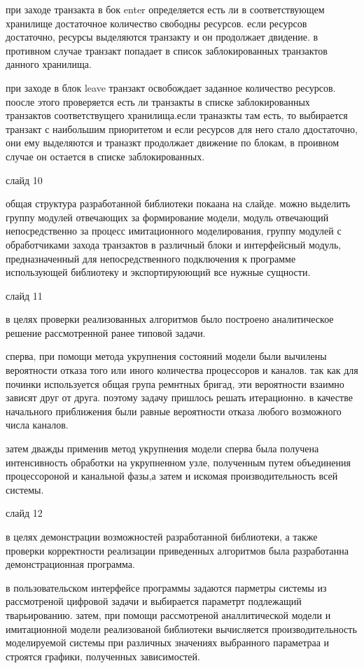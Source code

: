 \documentclass[utf8x, 12pt]{G7-32} %
\begin{document}
при заходе транзакта в бок enter определяется есть ли в соответствующем хранилище достаточное количество свободны ресурсов. если ресурсов достаточно, ресурсы выделяются транзакту и он продолжает двидение. в противном случае транзакт попадает в список заблокированных транзактов данного хранилища.

при заходе в блок leave транзакт освобождает заданное количество ресурсов. поосле этого проверяется есть ли транзакты в списке заблокированных транзактов соответствущего хранилища.если траназкты там есть, то выбирается транзакт с наибольшим приоритетом и если ресурсов для него стало ддостаточно, они ему выделяются и траназкт продолжает движение по блокам, в проивном случае он остается в списке заблокированных.

слайд 10

общая структура разработанной библиотеки покаана на слайде.
можно выделить группу модулей отвечающих за формирование модели, модуль отвечающий непосредственно за процесс имитационного моделирования, группу модулей с обработчиками захода транзактов в различный блоки и интерфейсный модуль, предназначенный для непосредственного подключения к программе использующей библиотеку и экспортируюющий все нужные сущности.

слайд 11

в целях проверки реализованных алгоритмов было построено аналитическое решение рассмотренной ранее типовой задачи. 

сперва, при помощи метода укрупнения состояний модели были вычилены вероятности отказа того или иного количества процессоров и каналов. так как для починки используется общая група ремнтных бригад, эти вероятности взаимно зависят друг от друга. поэтому задачу пришлось решать итерационно. в качестве начального приближения были равные вероятности отказа любого возможного числа каналов.

затем дважды применив  метод укрупнения модели сперва была получена интенсивность обработки на укрупненном узле, полученным путем объединения процессороной и канальной фазы,а затем и искомая производительность всей системы.

слайд 12

в целях демонстрации возможностей разработанной библиотеки, а также проверки корректности реализации приведенных алгоритмов была разработанна демонстрационная программа.

в пользовательском интерфейсе программы задаются парметры системы из рассмотреной цифровой задачи и выбирается параметрт подлежащий тварьированию. затем, при помощи рассмотреной аналлитической модели и имитационной модели реализованой библиотеки вычисляется производительность моделируемой системы при различных значениях выбранного параметраа и строятся графики, полученных зависимостей.
\end{document}
